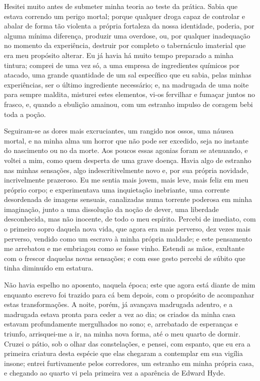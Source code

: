 Hesitei muito antes de submeter minha teoria ao teste da prática.  Sabia
que estava correndo um perigo mortal; porque qualquer droga capaz de
controlar e abalar de forma tão violenta a própria fortaleza da nossa
identidade, poderia, por alguma mínima diferença, produzir uma
overdose, ou, por qualquer inadequação no momento da experiência,
destruir por completo o tabernáculo imaterial que era meu propósito
alterar.  Eu já havia há muito tempo preparado a minha tintura; comprei
de uma vez só, a uma empresa de ingredientes químicos por atacado, uma
grande quantidade de um sal específico que eu sabia, pelas minhas
experiências, ser o último ingrediente necessário; e, na madrugada de
uma noite para sempre maldita, misturei estes elementos, vi-os
fervilhar e fumaçar juntos no frasco, e, quando a ebulição amainou, com
um estranho impulso de coragem bebi toda a poção.

Seguiram-se as dores mais excruciantes, um rangido nos ossos, uma náusea
mortal, e na minha alma um horror que não pode ser excedido, seja no
instante do nascimento ou no da morte.  Aos poucos essas agonias foram
se atenuando, e voltei a mim, como quem desperta de uma grave doença. 
Havia algo de estranho nas minhas sensações, algo indescritivelmente
novo e, por sua própria novidade, incrivelmente prazeroso.  Eu me
sentia mais jovem, mais leve, mais feliz em meu próprio corpo; e
experimentava uma inquietação inebriante, uma corrente desordenada de
imagens sensuais, canalizadas numa torrente poderosa em minha
imaginação, junto a uma dissolução da noção de dever, uma liberdade
desconhecida, mas não inocente, de todo o meu espírito.  Percebi de
imediato, com o primeiro sopro daquela nova vida, que agora era mais
perverso, dez vezes mais perverso, vendido como um escravo à minha
própria maldade; e este pensamento me arrebatou e me embriagou como se
fosse vinho.  Estendi as mãos, exultante com o frescor daquelas novas
sensações; e com esse gesto percebi de súbito que tinha diminuído em
estatura.

Não havia espelho no aposento, naquela época; este que agora está diante
de mim enquanto escrevo foi trazido para cá bem depois, com o propósito
de acompanhar estas transformações.  A noite, porém, já avançava
madrugada adentro, e a madrugada estava pronta para ceder a vez ao dia;
os criados da minha casa estavam profundamente mergulhados no sono; e,
arrebatado de esperanças e triunfo, arrisquei-me a ir, na minha nova
forma, até o meu quarto de dormir.  Cruzei o pátio, sob o olhar das
constelações, e pensei, com espanto, que eu era a primeira criatura
desta espécie que elas chegaram a contemplar em sua vigília insone;
entrei furtivamente pelos corredores, um estranho em minha própria
casa, e chegando ao quarto vi pela primeira vez a aparência de Edward
Hyde.

